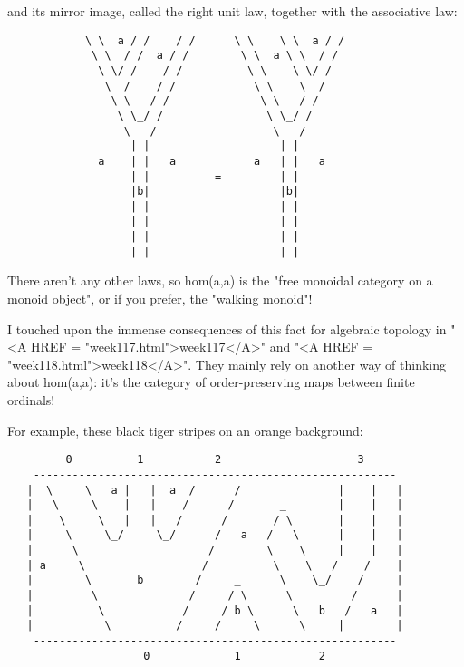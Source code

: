 and its mirror image, called the right unit law, together with the
associative law:

\begin{verbatim}
            \ \  a / /    / /      \ \    \ \  a / /
             \ \  / /  a / /        \ \  a \ \  / /
              \ \/ /    / /          \ \    \ \/ /
               \  /    / /            \ \    \  /
                \ \   / /              \ \   / /
                 \ \_/ /                \ \_/ /
                  \   /                  \   /
                   | |                    | |
              a    | |   a            a   | |   a
                   | |          =         | |
                   |b|                    |b|
                   | |                    | |
                   | |                    | |
                   | |                    | |
                   | |                    | |
\end{verbatim}
    
There aren't any other laws, so hom(a,a) is the "free monoidal
category on a monoid object", or if you prefer, the "walking
monoid"!


I touched upon the immense consequences of this fact for algebraic
topology in "<A HREF = "week117.html">week117</A>" and
"<A HREF = "week118.html">week118</A>".  They mainly rely on
another way of thinking about hom(a,a): it's the category of
order-preserving maps between finite ordinals!

For example, these black tiger stripes on an orange background:

\begin{verbatim}
         0          1           2                     3
    --------------------------------------------------------
   |  \     \   a |   |  a  /      /               |    |   |
   |   \     \    |   |    /      /       _        |    |   |
   |    \     \   |   |   /      /       / \       |    |   |
   |     \     \_/     \_/      /   a   /   \      |    |   |
   |      \                    /        \    \     |    |   |
   | a     \                  /          \    \   /    /    |
   |        \       b        /     _      \    \_/    /     |
   |         \              /     / \      \         /      |
   |          \            /     / b \      \   b   /   a   |
   |           \          /     /     \      \     |        |
    --------------------------------------------------------
                     0             1            2
\end{verbatim}
    
